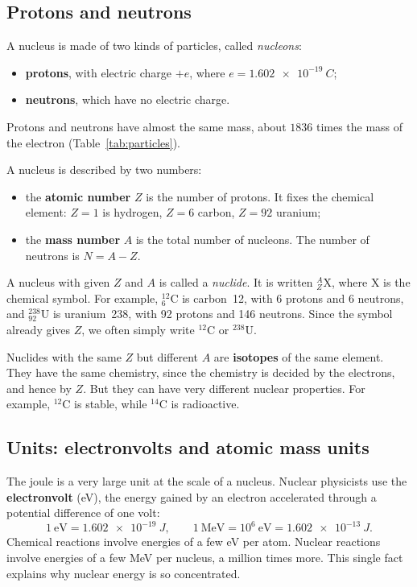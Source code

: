 \documentclass[11pt,a4paper]{article}
\newcommand{\nuc}[3]{\ensuremath{{}^{#1}_{#2}\mathrm{#3}}}   %
\newcommand{\iso}[2]{\ensuremath{{}^{#1}\mathrm{#2}}}         %
\begin{document}
\subsection{Protons and neutrons}

A nucleus is made of two kinds of particles, called \emph{nucleons}:
\begin{itemize}
  \item \textbf{protons}, with electric charge $+e$, where $e = \SI{1.602e-19}{C}$;
  \item \textbf{neutrons}, which have no electric charge.
\end{itemize}
Protons and neutrons have almost the same mass, about $1836$ times the mass of the electron (Table~\ref{tab:particles}).

A nucleus is described by two numbers:
\begin{itemize}
  \item the \textbf{atomic number} $Z$ is the number of protons. It fixes the chemical element: $Z=1$ is hydrogen, $Z=6$ carbon, $Z=92$ uranium;
  \item the \textbf{mass number} $A$ is the total number of nucleons. The number of neutrons is $N = A - Z$.
\end{itemize}
A nucleus with given $Z$ and $A$ is called a \emph{nuclide}. It is written $\nuc{A}{Z}{X}$, where X is the chemical symbol. For example, $\nuc{12}{6}{C}$ is carbon~12, with 6 protons and 6 neutrons, and $\nuc{238}{92}{U}$ is uranium~238, with 92 protons and 146 neutrons. Since the symbol already gives $Z$, we often simply write \iso{12}{C} or \iso{238}{U}.

Nuclides with the same $Z$ but different $A$ are \textbf{isotopes} of the same element. They have the same chemistry, since the chemistry is decided by the electrons, and hence by $Z$. But they can have very different nuclear properties. For example, \iso{12}{C} is stable, while \iso{14}{C} is radioactive.

\subsection{Units: electronvolts and atomic mass units}

The joule is a very large unit at the scale of a nucleus. Nuclear physicists use the \textbf{electronvolt} (eV), the energy gained by an electron accelerated through a potential difference of one volt:
\[
1~\text{eV} = \SI{1.602e-19}{J}, \qquad 1~\text{MeV} = 10^6~\text{eV} = \SI{1.602e-13}{J}.
\]
Chemical reactions involve energies of a few eV per atom. Nuclear reactions involve energies of a few MeV per nucleus, a million times more. This single fact explains why nuclear energy is so concentrated.
\end{document}
